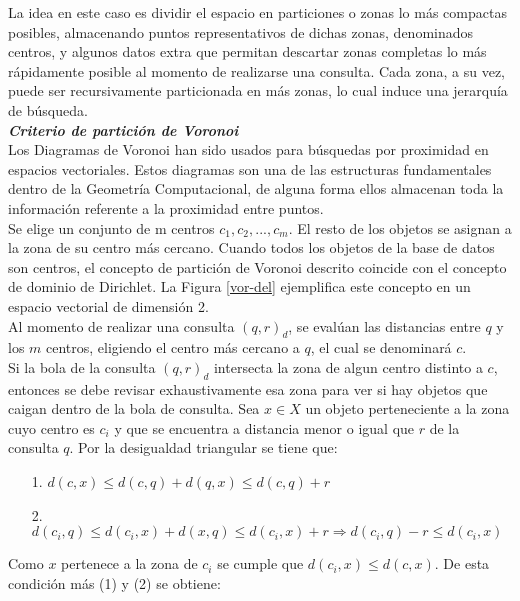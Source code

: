 La idea en este caso es dividir el espacio en particiones o zonas lo m\'as compactas posibles, almacenando puntos representativos de dichas zonas, denominados centros, y algunos datos extra que permitan descartar zonas completas lo m\'as r\'apidamente posible al momento de realizarse una consulta. Cada zona, a su vez, puede ser recursivamente particionada en m\'as zonas, lo cual induce una jerarqu\'ia de b\'usqueda.\\

\noindent \textbf{\textit{Criterio de partici\'on de Voronoi}}\\

Los Diagramas de Voronoi \cite{AUR91} han sido usados para b\'usquedas por proximidad en espacios vectoriales. Estos diagramas son una de las estructuras fundamentales dentro de la Geometr\'ia Computacional, de alguna forma ellos almacenan toda la informaci\'on referente a la proximidad entre puntos.\\

Se elige un conjunto de m centros ${c_1,c_2,...,c_m}$. El resto de los objetos se asignan a la zona de su centro m\'as cercano. Cuando todos los objetos de la base de datos son centros, el concepto de partici\'on de Voronoi descrito coincide con el concepto de dominio de Dirichlet. La Figura \ref{vor-del} ejemplifica este concepto en un espacio vectorial 
de dimensi\'on 2.\\


Al momento de realizar una consulta $(q, r)_d$, se eval\'uan las distancias entre $q$ y los $m$ centros, eligiendo el centro m\'as cercano a $q$, el cual se denominar\'a $c$.\\

Si la bola de la consulta $(q, r)_d$ intersecta la zona de algun centro distinto a $c$, entonces se debe revisar exhaustivamente esa zona para ver si hay objetos que caigan dentro de la bola de consulta. Sea $x \in X$ un objeto perteneciente a la zona cuyo centro es $c_i$ y que se encuentra a distancia menor o igual que $r$ de la consulta $q$. Por la desigualdad triangular se tiene que:

\begin{enumerate}
\item [1.] $d(c,x) \leq d(c,q) + d(q,x) \leq d(c,q) + r$
\item [2.]$d(c_i,q) \leq d(c_i,x) + d(x,q) \leq d(c_i,x) + r  \Rightarrow d(c_i,q) - r \leq d(c_i,x)$
\end{enumerate}

Como $x$ pertenece a la zona de $c_i$ se cumple que  $d(c_i,x) \leq d(c,x)$. De esta condici\'on m\'as (1) y (2) se obtiene:

